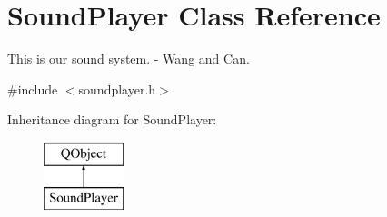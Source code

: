 \hypertarget{class_sound_player}{}\section{Sound\+Player Class Reference}
\label{class_sound_player}


This is our sound system. -\/ Wang and Can.  




{\ttfamily \#include $<$soundplayer.\+h$>$}

Inheritance diagram for Sound\+Player\+:\begin{figure}[H]
\begin{center}
\leavevmode
\includegraphics[height=2.000000cm]{class_sound_player}
\end{center}
\end{figure}
